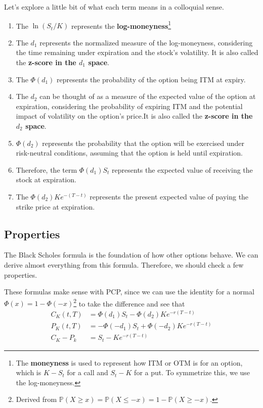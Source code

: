 \documentclass{article}
\begin{document}
    Let's explore a little bit of what each term means in a colloquial sense. 

    \begin{enumerate}
      \item The $\ln(S_t /K)$ represents the \textbf{log-moneyness}\footnote{The \textbf{moneyness} is used to represent how ITM or OTM is for an option, which is $K - S_t$ for a call and $S_t - K$ for a put. To symmetrize this, we use the log-moneyness.} 

      \item The $d_1$ represents the normalized measure of the log-moneyness, considering the time remaining under expiration and the stock's volatility. It is also called the \textbf{z-score in the $d_1$ space}. 

      \item The $\Phi(d_1)$ represents the probability of the option being ITM at expiry. 

      \item The $d_2$ can be thought of as a measure of the expected value of the option at expiration, considering the probability of expiring ITM and the potential impact of volatility on the option's price.It is also called the \textbf{z-score in the $d_2$ space}. 

      \item $\Phi(d_2)$ represents the probability that the option will be exercised under risk-neutral conditions, assuming that the option is held until expiration. 

      \item Therefore, the term $\Phi(d_1) S_t$ represents the expected value of receiving the stock at expiration.  

      \item The $\Phi(d_2) K e^{-(T - t)}$ represents the present expected value of paying the strike price at expiration. 
    \end{enumerate}

  \subsection{Properties}

    The Black Scholes formula is the foundation of how other options behave. We can derive almost everything from this formula. Therefore, we should check a few properties. 

    \begin{theorem}[PCP]
      These formulas make sense with PCP, since we can use the identity for a normal $\Phi(x) = 1 - \Phi(-x)$\footnote{Derived from $\mathbb{P}(X \geq x) = \mathbb{P}(X \leq -x) = 1 - \mathbb{P}(X \geq -x)$.} to take the difference and see that 
      \begin{align*}
        C_K (t, T) & = \Phi(d_1) S_t - \Phi (d_2) K e^{-r (T - t)} \\ 
        P_K (t, T) & = -\Phi(-d_1) S_t + \Phi (-d_2) K e^{-r (T - t)} \\
        C_K  - P_k & = S_t - K e^{-r (T - t)}
      \end{align*}
    \end{theorem}
\end{document}
